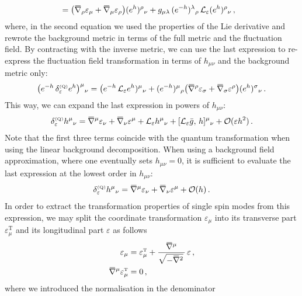 \documentclass[11pt]{book}
\newcommand{\overbar}[1]{\mkern 1.5mu\overline{\mkern-1.5mu#1\mkern-1.5mu}\mkern 1.5mu}
\newcommand{\bnabla}{\overbar \nabla}
\newcommand{\Lie}{{\cal L}}
\numberwithin{equation}{chapter}
\begin{document}
\begin{appendices}
\begin{align}
  &= \big( \bnabla_\rho \varepsilon_\mu + \bnabla_\mu \varepsilon_\rho \big) (e^h)^\rho{}_\nu
  + g_{\mu\lambda} \, (e^{-h})^\lambda{}_\rho \, \Lie_\varepsilon (e^h)^\rho{}_\nu \,,
\end{align}
where, in the second equation we used the properties of the Lie derivative
and rewrote the background metric in terms of the full metric and the fluctuation
field. By contracting with the inverse metric,
we can use the last expression
to re-express the fluctuation field transformation in terms of $h_{\mu\nu}$
and the background metric only:
\begin{align}
  \big( e^{-h} \, \delta^{\scriptscriptstyle{(\mathrm Q)}}_\varepsilon e^h \big)^\mu{}_\nu
  = \big( e^{-h} \, \Lie_\varepsilon  e^h)^\mu{}_\nu
  + (e^{-h})^\mu{}_\rho \big( \bnabla^\rho \varepsilon_\sigma + \bnabla_\sigma \varepsilon^\rho \big)
  (e^h)^\sigma{}_\nu \,.
\end{align}
This way, we can expand the last expression in powers of $h_{\mu\nu}$:
\begin{align}
  \delta^{\scriptscriptstyle{(\mathrm Q)}}_\varepsilon h^\mu{}_\nu=
  \bnabla^\mu \varepsilon_\nu + \bnabla_\nu \varepsilon^\mu
  + \Lie_\varepsilon h^\mu{}_\nu
  + [\Lie_\varepsilon \bar g , \, h]^\mu{}_\nu
  + \mathcal O(\varepsilon h^2) \,.
\end{align}
Note that
the first three terms coincide with the quantum transformation when using
the linear background decomposition.
When using a background field approximation, where one eventually sets
$h_{\mu\nu} = 0$, it is sufficient to evaluate the last expression
at the lowest order in $h_{\mu\nu}$:
\begin{align}
  \delta^{\scriptscriptstyle{(\mathrm Q)}}_\varepsilon h^\mu{}_\nu=
  \bnabla^\mu \varepsilon_\nu + \bnabla_\nu \varepsilon^\mu
  + \mathcal O(h) \,.
\end{align}
In order to extract the transformation properties of single
spin modes from this expression, we may split the coordinate
transformation $\varepsilon_\mu$ into its transverse part
$\varepsilon^{\scriptscriptstyle \mathrm T}_\mu$
and its longitudinal part
$\varepsilon$
as follows
\begin{align}
  \varepsilon_\mu &= \varepsilon^{\scriptscriptstyle \mathrm T}_\mu +
  \frac{\bnabla^\mu}{\sqrt{-\bnabla^2} \, } \, \varepsilon \,, \\
  \bnabla^\mu \varepsilon^{\scriptscriptstyle \mathrm T}_\mu &= 0 \,,
\end{align}
where we introduced the normalisation in the denominator

\end{appendices}
\end{document}
